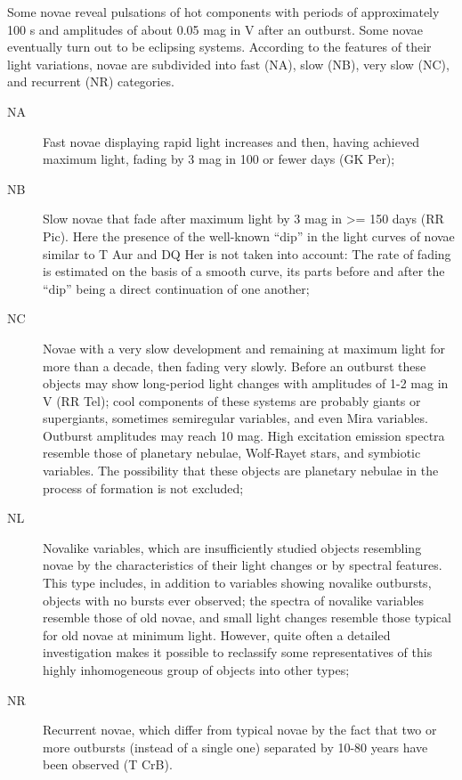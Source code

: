 \begin{description}
				Some novae reveal pulsations of hot components with periods of
				approximately 100 s and amplitudes of about 0.05 mag in V after an
				outburst. Some novae eventually turn out to be eclipsing systems.
				According to the features of their light variations, novae are
				subdivided into fast (NA), slow (NB), very slow (NC), and recurrent (NR)
				categories.
	\begin{description}
\item[NA]		Fast novae displaying rapid light increases and then, having
				achieved maximum light, fading by 3 mag in 100 or fewer days (GK Per);
\item[NB]		Slow novae that fade after maximum light by 3 mag in
				\textgreater{}= 150 days (RR Pic). Here the presence of the well-known
				``dip'' in the light curves of novae similar to T Aur and DQ Her is not
				taken into account: The rate of fading is estimated on the basis of a
				smooth curve, its parts before and after the ``dip'' being a direct
				continuation of one another;
				\item[NC] Novae with a very slow development and remaining at maximum
				light for more than a decade, then fading very slowly. Before an
				outburst these objects may show long-period light changes with
				amplitudes of 1-2 mag in V (RR Tel); cool components of these systems
				are probably giants or supergiants, sometimes semiregular variables, and
				even Mira variables. Outburst amplitudes may reach 10 mag. High
				excitation emission spectra resemble those of planetary nebulae,
				Wolf-Rayet stars, and symbiotic variables. The possibility that these
				objects are planetary nebulae in the process of formation is not
				excluded;
\item[NL]		Novalike variables, which are insufficiently studied objects
				resembling novae by the characteristics of their light changes or by
				spectral features. This type includes, in addition to variables showing
				novalike outbursts, objects with no bursts ever observed; the spectra of
				novalike variables resemble those of old novae, and small light changes
				resemble those typical for old novae at minimum light. However, quite
				often a detailed investigation makes it possible to reclassify some
				representatives of this highly inhomogeneous group of objects into other
				types;
\item[NR]		Recurrent novae, which differ from typical novae by the fact
				that two or more outbursts (instead of a single one) separated by 10-80
				years have been observed (T CrB).

\end{description}
\end{description}
